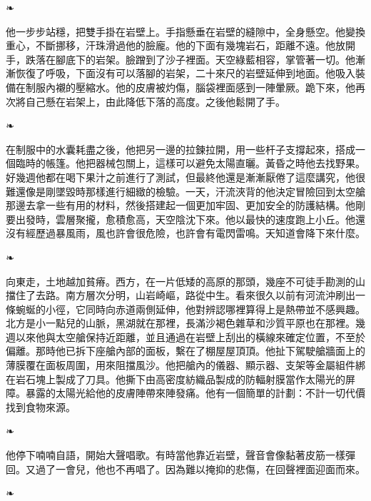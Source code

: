 \documentclass[10pt]{article}
\begin{document}
\begin{center}❧\end{center}

他一步步站穩，把雙手掛在岩壁上。手指懸垂在岩壁的縫隙中，全身懸空。他變換重心，不斷挪移，汗珠滑過他的臉龐。他的下面有幾塊岩石，距離不遠。他放開手，跌落在腳底下的岩架。臉蹭到了沙子裡面。天空綠藍相容，掌管著一切。他漸漸恢復了呼吸，下面沒有可以落腳的岩架，二十來尺的岩壁延伸到地面。他吸入裝備在制服內襯的壓縮水。他的皮膚被灼傷，腦袋裡面感到一陣暈厥。跪下來，他再次將自己懸在岩架上，由此降低下落的高度。之後他鬆開了手。

\begin{center}❧\end{center}

在制服中的水囊耗盡之後，他把另一邊的拉鍊拉開，用一些杆子支撐起來，搭成一個臨時的帳篷。他把器械包關上，這樣可以避免太陽直曬。黃昏之時他去找野果。好幾週他都在喝下果汁之前進行了測試，但最終他還是漸漸厭倦了這麼講究，他很難還像是剛墜毀時那樣進行細緻的檢驗。一天，汗流浹背的他決定冒險回到太空艙那邊去拿一些有用的材料，然後搭建起一個更加牢固、更加安全的防護結構。他剛要出發時，雲層聚攏，愈積愈高，天空陰沈下來。他以最快的速度跑上小丘。他還沒有經歷過暴風雨，風也許會很危險，也許會有電閃雷鳴。天知道會降下來什麼。

\begin{center}❧\end{center}

向東走，土地越加貧瘠。西方，在一片低矮的高原的那頭，幾座不可徒手勘測的山擋住了去路。南方層次分明，山岩崎嶇，路從中生。看來很久以前有河流沖刷出一條蜿蜒的小徑，它同時向赤道兩側延伸，他對辨認哪裡算得上是熱帶並不感興趣。北方是小一點兒的山脈，黑湖就在那裡，長滿沙褐色雜草和沙質平原也在那裡。幾週以來他與太空艙保持近距離，並且通過在岩壁上刮出的橫線來確定位置，不至於偏離。那時他已拆下座艙內部的面板，繫在了棚屋屋頂頂。他扯下駕駛艙牆面上的薄膜覆在面板周圍，用來阻擋風沙。他把艙內的儀器、顯示器、支架等金屬組件綁在岩石塊上製成了刀具。他撕下由高密度紡織品製成的防輻射膜當作太陽光的屏障。暴露的太陽光給他的皮膚陣帶來陣發痛。他有一個簡單的計劃：不計一切代價找到食物來源。

\begin{center}❧\end{center}

他停下喃喃自語，開始大聲唱歌。有時當他靠近岩壁，聲音會像黏著皮筋一樣彈回。又過了一會兒，他也不再唱了。因為難以掩抑的悲傷，在回聲裡面迎面而來。

\begin{center}❧\end{center}
\end{document}
